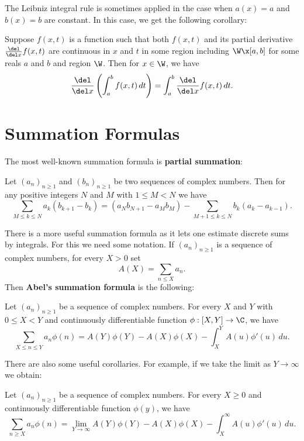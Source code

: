     The Leibniz integral rule is sometimes applied in the case when $a(x) = a$ and $b(x) = b$ are constant. In this case, we get the following corollary:

    \begin{corollary}
      Suppose $f(x,t)$ is a function such that both $f(x,t)$ and its partial derivative $\frac{\del}{\del x}f(x,t)$ are continuous in $x$ and $t$ in some region including $\W \x [a,b]$ for some reals $a$ and $b$ and region $\W$. Then for $x \in \W$, we have
      \[
        \frac{\del}{\del x}\left(\int_{a}^{b}f(x,t)\,dt\right) = \int_{a}^{b}\frac{\del}{\del x}f(x,t)\,dt.
      \]
    \end{corollary}
  \section{Summation Formulas}\label{append:Summation_Formulas}
    The most well-known summation formula is \textbf{partial summation}:

    \begin{theorem}\label{thm:partial_summation}
      Let $(a_{n})_{n \ge 1}$ and $(b_{n})_{n \ge 1}$ be two sequences of complex numbers. Then for any positive integers $N$ and $M$ with $1 \le M < N$ we have
      \[
        \sum_{M \le k \le N}a_{k}(b_{k+1}-b_{k}) = (a_{N}b_{N+1}-a_{M}b_{M})-\sum_{M+1 \le k \le N}b_{k}(a_{k}-a_{k-1}).
      \]
    \end{theorem}
    
    There is a more useful summation formula as it lets one estimate discrete sums by integrals. For this we need some notation. If $(a_{n})_{n \ge 1}$ is a sequence of complex numbers, for every $X > 0$ set
    \[
        A(X) = \sum_{n \le X}a_{n}.
    \]
    Then \textbf{Abel's summation formula} is the following:

    \begin{theorem}
      Let $(a_{n})_{n \ge 1}$ be a sequence of complex numbers. For every $X$ and $Y$ with $0 \le X < Y$ and continuously differentiable function $\phi:[X,Y] \to \C$, we have
      \[
        \sum_{X \le n \le Y}a_{n}\phi(n) = A(Y)\phi(Y)-A(X)\phi(X)-\int_{X}^{Y}A(u)\phi'(u)\,du.
      \]
    \end{theorem}

    There are also some useful corollaries. For example, if we take the limit as $Y \to \infty$ we obtain:

    \begin{corollary}\label{cor:Abels_summation_formula_limit_version}
      Let $(a_{n})_{n \ge 1}$ be a sequence of complex numbers. For every $X \ge 0$ and continuously differentiable function $\phi(y)$, we have
      \[
        \sum_{n \ge X}a_{n}\phi(n) = \lim_{Y \to \infty}A(Y)\phi(Y)-A(X)\phi(X)-\int_{X}^{\infty}A(u)\phi'(u)\,du.
      \]
    \end{corollary}

